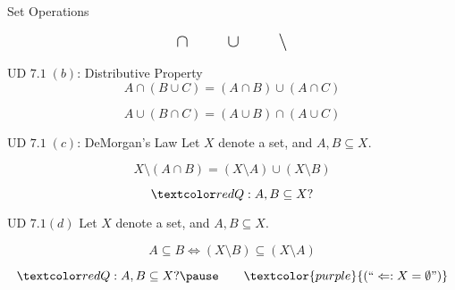 
\begin{frame}{}
  \centerline{\Large Set Operations}

  \[
    \text{\Large $\cap \qquad \cup \qquad \setminus$}
  \]
\end{frame}

\begin{frame}{}
  \begin{exampleblock}{UD $7.1 \;(b)$: Distributive Property}
    \[
      A \cap (B \cup C) = (A \cap B) \cup (A \cap C)
    \]
  \end{exampleblock}

  \pause
  \vspace{0.50cm}
  \begin{theorem}
    \[
      A \cup (B \cap C) = (A \cup B) \cap (A \cup C)
    \]

  \end{theorem}
\end{frame}

\begin{frame}{}
  \begin{exampleblock}{UD $7.1 \;(c)$: DeMorgan's Law}
    Let $X$ denote a set, and $A, B \subseteq X$.

    \[
      X \setminus (A \cap B) = (X \setminus A) \cup (X \setminus B)
    \]
  \end{exampleblock}

  \pause
  \vspace{0.50cm}
  \[
    \red{Q: A, B \subseteq X?}
  \]
\end{frame}

\begin{frame}{}
  \begin{exampleblock}{UD $7.1 (d)$}
    Let $X$ denote a set, and $A, B \subseteq X$.

    \[
      A \subseteq B \iff (X \setminus B) \subseteq (X \setminus A)
    \]
  \end{exampleblock}

  \pause
  \vspace{0.50cm}

  \pause
  \centerline{}

  \pause
  \[
    \red{Q: A, B \subseteq X?} \pause \qquad \textcolor{purple}{(``\Leftarrow: X = \emptyset")}
  \]
\end{frame}

